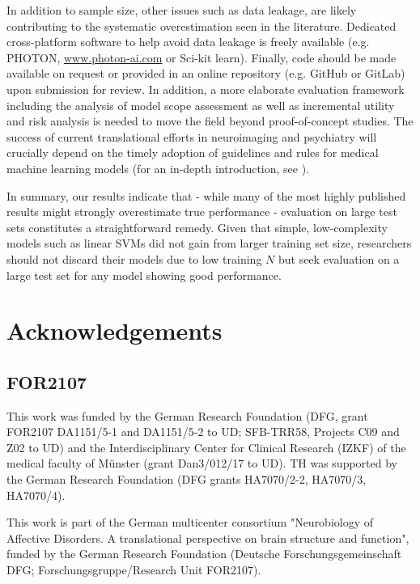 \documentclass{article}
\begin{document}
    In addition to sample size, other issues such as data leakage\cite{Kambeitz2017}, are likely contributing to the systematic overestimation seen in the literature. Dedicated cross-platform software to help avoid data leakage is freely available (e.g. PHOTON, \url{www.photon-ai.com} or Sci-kit learn\cite{Scikit-learn2018}). Finally, code should be made available on request or provided in an online repository (e.g. GitHub or GitLab) upon submission for review. In addition, a more elaborate evaluation framework including the analysis of model scope assessment as well as incremental utility and risk analysis is needed to move the field beyond proof-of-concept studies. The success of current translational efforts in neuroimaging and psychiatry will crucially depend on the timely adoption of guidelines and rules for medical machine learning models (for an in-depth introduction, see \cite{Hahn2019}).

    In summary, our results indicate that - while many of the most highly published results might strongly overestimate true performance - evaluation on large test sets constitutes a straightforward remedy. Given that simple, low-complexity models such as linear SVMs did not gain from larger training set size, researchers should not discard their models due to low training $N$ but seek evaluation on a large test set for any model showing good performance.

    \section*{Acknowledgements}
    \subsection*{FOR2107}
    This work was funded by the German Research Foundation (DFG, grant FOR2107 DA1151/5-1 and DA1151/5-2 to UD; SFB-TRR58, Projects C09 and Z02 to UD) and the Interdisciplinary Center for Clinical Research (IZKF) of the medical faculty of Münster (grant Dan3/012/17 to UD). TH was supported by the German Research Foundation (DFG grants HA7070/2-2, HA7070/3, HA7070/4).

    This work is part of the German multicenter consortium "Neurobiology of Affective Disorders. A translational perspective on brain structure and function", funded by the German Research Foundation (Deutsche Forschungsgemeinschaft DFG; Forschungsgruppe/Research Unit FOR2107).
\end{document}
